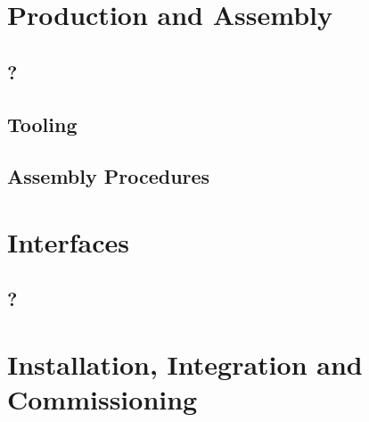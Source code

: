 \section{Production and Assembly}
\label{sec:fddp-tpc-elec-prod-assy}

\subsection{?}
\label{sec:fddp-tpc-elec-?}



\subsection{Tooling}
\label{sec:fddp-tpc-elec-tooling}


\subsection{Assembly Procedures}
\label{sec:fddp-tpc-elec-assy}



\section{Interfaces}
\label{sec:fddp-tpc-elec-intfc}



\subsection{?}
\label{sec:fddp-tpc-elec-intfc-?}




\section{Installation, Integration and Commissioning}
\label{sec:fddp-tpc-elec-install}

